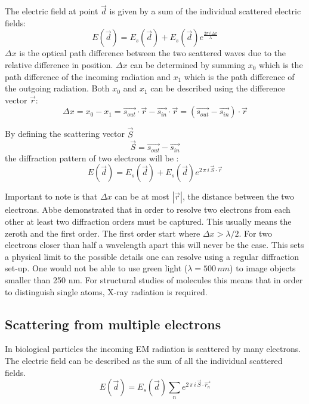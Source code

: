 The electric field at point $\vec{d}$ is given by a sum of the individual scattered electric fields:
\begin{equation}
E(\vec{d}) = E_s(\vec{d})+E_s(\vec{d}) e^{\frac{2 \pi\,i\,\Delta x}{\lambda}} 	 
\end{equation}
$\Delta x$ is the optical path difference between the two scattered waves due to the relative difference in position. $\Delta x$ can be determined by summing $x_0$ which is the path difference of the incoming radiation and $x_1$ which is the path difference of the outgoing radiation. Both $x_0$ and $x_1$ can be described using the difference vector $\vec{r}$: 
\begin{equation}
\Delta x = x_0 - x_1 =\vec{s_{out}} \cdot \vec{r}-\vec{ s_{in}}\cdot \vec{r} = (\vec{s_{out}} -\vec{s_{in}} ) \cdot \vec{r} 
\end{equation}

By defining the scattering vector $\vec{S}$
\begin{equation}
\vec{S} = \vec{s_{out}}-\vec{s_{in}}
\end{equation}
the diffraction pattern of two electrons will be :
\begin{equation}
E(\vec{d}) = E_s(\vec{d}) + E_s(\vec{d}) e^{2\,\pi\,  i\,\vec{S}\cdot\vec{r}}
\end{equation}

Important to note is that $\Delta x $ can be at most $|\vec{r}|$, the distance between the two electrons. Abbe demonstrated that in order to resolve two electrons from each other at least two diffraction orders must be captured. This usually means the zeroth and the first order. The first order start where $\Delta x > \lambda/2$. For two electrons closer than half a wavelength apart this will never be the case. This sets a physical limit to the possible details one can resolve using a regular diffraction set-up. One would not be able to use green light ($\lambda = 500\,nm$) to image objects smaller than 250 nm. For structural studies of molecules this means that in order to distinguish single atoms, X-ray radiation is required.


\subsection{Scattering from multiple electrons}
In biological particles the incoming EM radiation is scattered by many electrons. The electric field can be described as the sum of all the individual scattered fields.
\begin{equation}\label{eq:boehoe}
E(\vec{d}) = E_s(\vec{d}) \sum_{n} e^{2\,\pi\,  i\,\vec{S}\cdot\vec{r_n}}
\end{equation}


